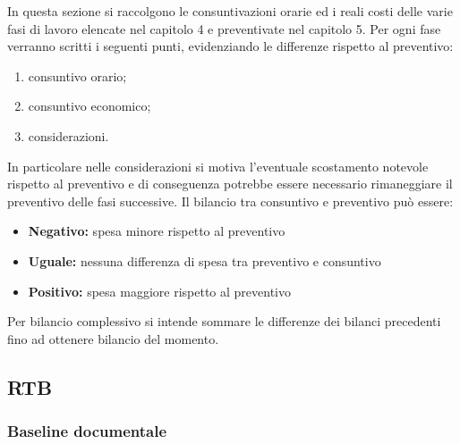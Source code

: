 In questa sezione si raccolgono le consuntivazioni orarie ed i reali costi delle varie fasi di lavoro elencate nel 
capitolo 4 e preventivate nel capitolo 5. \newline
Per ogni fase verranno scritti i seguenti punti, evidenziando le differenze rispetto al preventivo:
\begin{enumerate}
    \item consuntivo orario;
    \item consuntivo economico;
    \item considerazioni.
\end{enumerate}
In particolare nelle considerazioni si motiva l'eventuale scostamento notevole rispetto al preventivo
e di conseguenza potrebbe essere necessario rimaneggiare il preventivo delle fasi successive.
Il bilancio tra consuntivo e preventivo può essere:
\begin{itemize}
    \item \textbf{Negativo: } spesa minore rispetto al preventivo
    \item \textbf{Uguale: } nessuna differenza di spesa tra preventivo e consuntivo
    \item \textbf{Positivo: } spesa maggiore rispetto al preventivo
\end{itemize}
Per bilancio complessivo si intende sommare le differenze dei bilanci precedenti 
fino ad ottenere bilancio del momento.

\subsection{RTB}
\subsubsection{Baseline documentale}
